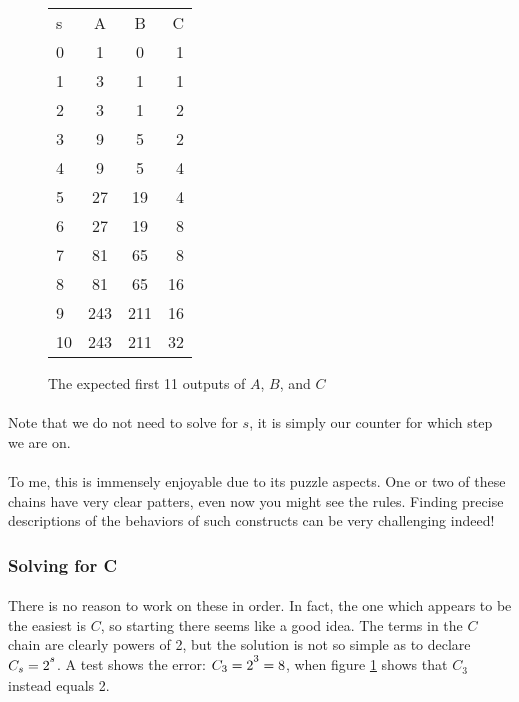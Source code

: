 \documentclass[12pt,letterpaper]{article}
\begin{document}
			\begin{figure}[h]
				\centering
				\begin{tabular}{l | c | c | r}
					s & A & B & C \\
					0 & 1 & 0 & 1 \\
					1 & 3 & 1 & 1 \\
					2 & 3 & 1 & 2 \\
					3 & 9 & 5 & 2 \\
					4 & 9 & 5 & 4 \\
					5 & 27 & 19 & 4 \\
					6 & 27 & 19 & 8 \\
					7 & 81 & 65 & 8 \\
					8 & 81 & 65 & 16 \\
					9 & 243 & 211 & 16 \\
					10 & 243 & 211 & 32 \\
				\end{tabular}
			
				\caption{The expected first 11 outputs of $A$, $B$, and $C$}
				\label{table:sabc}
			\end{figure}
		
			\newpage %
			
			\paragraph{} Note that we do not need to solve for $s$, it is simply our counter for which step we are on.
			
			\paragraph{} To me, this is immensely enjoyable due to its puzzle aspects. One or two of these chains have very clear patters, even now you might see the rules. Finding precise descriptions of the behaviors of such constructs can be very challenging indeed!
			
		\subsubsection{Solving for C} \label{sss:c}
			
			\paragraph{} There is no reason to work on these in order. In fact, the one which appears to be the easiest is $C$, so starting there seems like a good idea. The terms in the $C$ chain are clearly powers of 2, but the solution is not so simple as to declare $C_s = 2\strut^s$. A test shows the error: $C_3 = 2\strut^3 = 8$, when figure \ref{table:sabc} shows that $C_3$ instead equals 2. 
			
\end{document}
